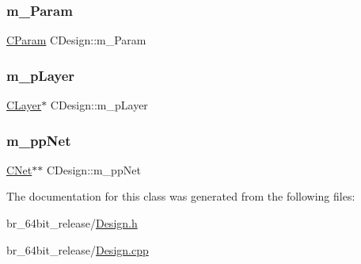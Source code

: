 \mbox{\label{classCDesign_a489d3618699827b5e627a664f2f7d5f5}} 
\subsubsection{\texorpdfstring{m\_Param}{m\_Param}}
{\footnotesize\ttfamily \mbox{\hyperlink{classCParam}{C\+Param}} C\+Design\+::m\+\_\+\+Param}

\mbox{\label{classCDesign_a6fe2e83d890daebc1c45959177e54fc4}} 
\subsubsection{\texorpdfstring{m\_pLayer}{m\_pLayer}}
{\footnotesize\ttfamily \mbox{\hyperlink{classCLayer}{C\+Layer}}$\ast$ C\+Design\+::m\+\_\+p\+Layer\hspace{0.3cm}{\ttfamily [protected]}}

\mbox{\label{classCDesign_a444cb73bf4b13f1d192c45a3d264d968}} 
\subsubsection{\texorpdfstring{m\_ppNet}{m\_ppNet}}
{\footnotesize\ttfamily \mbox{\hyperlink{classCNet}{C\+Net}}$\ast$$\ast$ C\+Design\+::m\+\_\+pp\+Net\hspace{0.3cm}{\ttfamily [protected]}}



The documentation for this class was generated from the following files\+:\begin{DoxyCompactItemize}
\item 
br\+\_\+64bit\+\_\+release/\mbox{\hyperlink{Design_8h}{Design.\+h}}\item 
br\+\_\+64bit\+\_\+release/\mbox{\hyperlink{Design_8cpp}{Design.\+cpp}}\end{DoxyCompactItemize}
